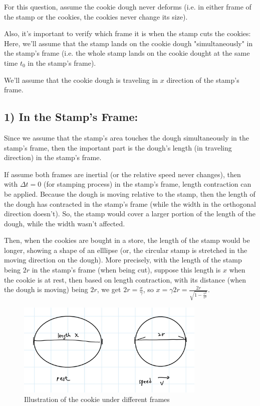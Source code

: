 \documentclass{article}
\begin{document}
For this question, assume the cookie dough never deforms (i.e. in either frame of the stamp or the cookies, the cookies never change its size). 

Also, it's important to verify which frame it is when the stamp cuts the cookies: Here, we'll assume that the stamp lands on the cookie dough "simultaneously" in the stamp's frame (i.e. the whole stamp lands on the cookie dought at the same time $t_0$ in the stamp's frame).

We'll assume that the cookie dough is traveling in $x$ direction of the stamp's frame.

\subsection*{1) In the Stamp's Frame:}
Since we assume that the stamp's area touches the dough simultaneously in the stamp's frame, then the important part is the dough's length (in traveling direction) in the stamp's frame. 

If assume both frames are inertial (or the relative speed never changes), then with $\Delta t=0$ (for stamping process) in the stamp's frame, length contraction can be applied. Because the dough is moving relative to the stamp, then the length of the dough has contracted in the stamp's frame (while the width in the orthogonal direction doesn't). So, the stamp would cover a larger portion of the length of the dough, while the width wasn't affected. 

Then, when the cookies are bought in a store, the length of the stamp would be longer, showing a shape of an elllipse (or, the circular stamp is stretched in the moving direction on the dough). More precisely, with the length of the stamp being $2r$ in the stamp's frame (when being cut), suppose this length is $x$ when the cookie is at rest, then based on length contraction, with its distance (when the dough is moving) being $2r$, we get $2r = \frac{x}{\gamma}$, so $x = \gamma 2r = \frac{2r}{\sqrt{1-\frac{v^2}{c^2}}}$.

\begin{figure}[h!]
    \begin{center}
        \includegraphics[width=90mm]{hw4 q31.jpg}
        \caption{Illustration of the cookie under different frames}
    \end{center}
\end{figure}
\end{document}

